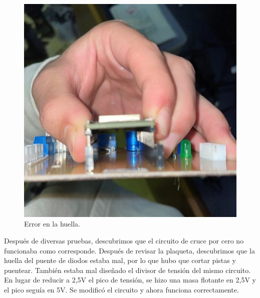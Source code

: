\begin{figure}[H]
    \centering
    \includegraphics[width=0.75\linewidth]{informes/IMG_8472.jpg}
    \caption{Error en la huella.}
\end{figure}

Después de diversas pruebas, descubrimos que el circuito de cruce por cero no funcionaba como corresponde. Después de revisar la plaqueta, descubrimos que la huella del puente de diodos estaba mal, por lo que hubo que cortar pistas y puentear. También estaba mal diseñado el divisor de tensión del mismo circuito. En lugar de reducir a 2,5V el pico de tensión, se hizo una masa flotante en 2,5V y el pico seguía en 5V. Se modificó el circuito y ahora funciona correctamente.\\

